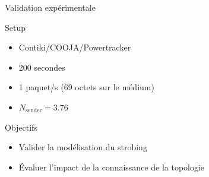 \begin{frame}{Validation expérimentale}
  \begin{block}{Setup}
    \begin{itemize}
      \item Contiki/COOJA/Powertracker
      \item 200 secondes
      \item 1 paquet/s (69 octets sur le médium)
      \item $N_{\textrm{sender}} = 3.76$
    \end{itemize}
  \end{block}
  \begin{figure}
    \centering
    
  \end{figure}
  \begin{alertblock}{Objectifs}
    \begin{itemize}
      \item Valider la modélisation du strobing
      \item Évaluer l'impact de la connaissance de la topologie
    \end{itemize}
  \end{alertblock}

\end{frame}



